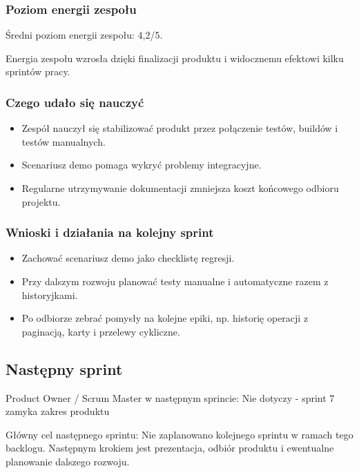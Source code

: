 \documentclass[12pt,a4paper]{article}
\begin{document}
\subsubsection*{Poziom energii zespołu}
Średni poziom energii zespołu: 4,2/5.

Energia zespołu wzrosła dzięki finalizacji produktu i widocznemu efektowi kilku sprintów pracy.

\subsubsection*{Czego udało się nauczyć}
\begin{itemize}
\item Zespół nauczył się stabilizować produkt przez połączenie testów, buildów i testów manualnych.
\item Scenariusz demo pomaga wykryć problemy integracyjne.
\item Regularne utrzymywanie dokumentacji zmniejsza koszt końcowego odbioru projektu.
\end{itemize}
\subsubsection*{Wnioski i działania na kolejny sprint}
\begin{itemize}
\item Zachować scenariusz demo jako checklistę regresji.
\item Przy dalszym rozwoju planować testy manualne i automatyczne razem z historyjkami.
\item Po odbiorze zebrać pomysły na kolejne epiki, np. historię operacji z paginacją, karty i przelewy cykliczne.
\end{itemize}

\subsection*{Następny sprint}
Product Owner / Scrum Master w następnym sprincie: Nie dotyczy - sprint 7 zamyka zakres produktu

Główny cel następnego sprintu: Nie zaplanowano kolejnego sprintu w ramach tego backlogu. Następnym krokiem jest prezentacja, odbiór produktu i ewentualne planowanie dalszego rozwoju.
\end{document}
